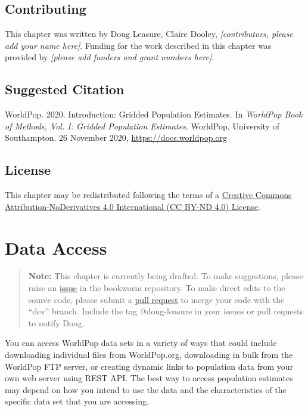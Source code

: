 \documentclass[]{book}
\begin{document}
\section*{Contributing}\label{contributing}

This chapter was written by Doug Leasure, Claire Dooley,
\emph{{[}contributors, please add your name here{]}}. Funding for the
work described in this chapter was provided by \emph{{[}please add
funders and grant numbers here{]}}.

\section*{Suggested Citation}\label{suggested-citation}

WorldPop. 2020. Introduction: Gridded Population Estimates. In
\emph{WorldPop Book of Methods, Vol. I: Gridded Population Estimates}.
WorldPop, University of Southampton. 26 November 2020,
\url{https://docs.worldpop.org}

\section*{License}\label{license}

This chapter may be redistributed following the terms of a
\href{https://creativecommons.org/licenses/by-nd/4.0/}{Creative Commons
Attribution-NoDerivatives 4.0 International (CC BY-ND 4.0) License}.

\chapter{Data Access}\label{data-access}

\begin{quote}
\textbf{Note:} This chapter is currently being drafted. To make
suggestions, please raise an
\href{https://github.com/wpgp/bookworm/issues}{issue} in the bookworm
repository. To make direct edits to the source code, please submit a
\href{https://github.com/wpgp/bookworm/pulls}{pull request} to merge
your code with the ``dev'' branch. Include the tag @doug-leasure in your
issues or pull requests to notify Doug.
\end{quote}

You can access WorldPop data sets in a variety of ways that could
include downloading individual files from WorldPop.org, downloading in
bulk from the WorldPop FTP server, or creating dynamic links to
population data from your own web server using REST API. The best way to
access population estimates may depend on how you intend to use the data
and the characteristics of the specific data set that you are accessing.
\end{document}
